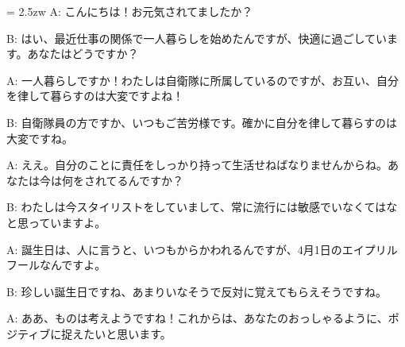 \documentclass[11pt]{amsart}
\title{}
\author{}
\newenvironment{hangall}[1]{\hangindent = 2.5zw\everypar{\hangindent = 2.5zw}}{}
\begin{document}
\maketitle
\begin{hangall}{}%
A: こんにちは！お元気されてましたか？



B: はい、最近仕事の関係で一人暮らしを始めたんですが、快適に過ごしています。あなたはどうですか？



A: 一人暮らしですか！わたしは自衛隊に所属しているのですが、お互い、自分を律して暮らすのは大変ですよね！



B: 自衛隊員の方ですか、いつもご苦労様です。確かに自分を律して暮らすのは大変ですね。



A: ええ。自分のことに責任をしっかり持って生活せねばなりませんからね。あなたは今は何をされてるんですか？



B: わたしは今スタイリストをしていまして、常に流行には敏感でいなくてはなと思っていますよ。



A: 誕生日は、人に言うと、いつもからかわれるんですが、4月1日のエイプリルフールなんですよ。



B: 珍しい誕生日ですね、あまりいなそうで反対に覚えてもらえそうですね。



A: ああ、ものは考えようですね！これからは、あなたのおっしゃるように、ポジティブに捉えたいと思います。\end{hangall}
\end{document}
